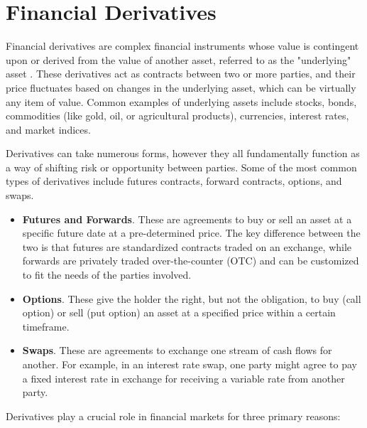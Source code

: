 \section{Financial Derivatives}
\label{sec:derivatives}

Financial derivatives are complex financial instruments whose value is contingent upon or derived from the value of another asset, referred to as the "underlying" asset \citep{quail2002financial}. These derivatives act as contracts between two or more parties, and their price fluctuates based on changes in the underlying asset, which can be virtually any item of value. Common examples of underlying assets include stocks, bonds, commodities (like gold, oil, or agricultural products), currencies, interest rates, and market indices.

Derivatives can take numerous forms, however they all fundamentally function as a way of shifting risk or opportunity between parties. Some of the most common types of derivatives include futures contracts, forward contracts, options, and swaps.

\begin{itemize}
    \item \textbf{Futures and Forwards}. These are agreements to buy or sell an asset at a specific future date at a pre-determined price. The key difference between the two is that futures are standardized contracts traded on an exchange, while forwards are privately traded over-the-counter (OTC) and can be customized to fit the needs of the parties involved.

    \item \textbf{Options}. These give the holder the right, but not the obligation, to buy (call option) or sell (put option) an asset at a specified price within a certain timeframe.

    \item \textbf{Swaps}. These are agreements to exchange one stream of cash flows for another. For example, in an interest rate swap, one party might agree to pay a fixed interest rate in exchange for receiving a variable rate from another party.
\end{itemize}

Derivatives play a crucial role in financial markets for three primary reasons:

